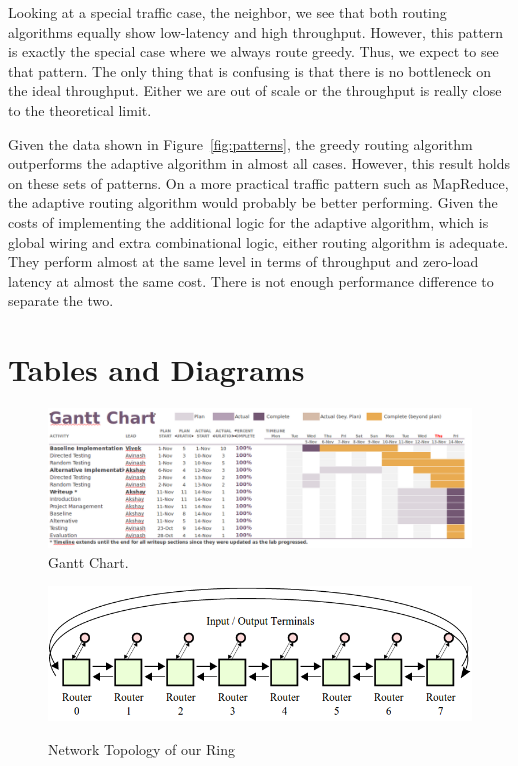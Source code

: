\documentclass[10pt]{article}
\begin{document}
Looking at a special traffic case, the neighbor, we see that both 
routing algorithms equally show low-latency and high throughput. 
However, this pattern is exactly the special case where we always 
route greedy. Thus, we expect to see that pattern.
The only thing that is confusing is that there is no bottleneck on the ideal
throughput.
Either we are out of scale or the throughput is really close to the theoretical
limit. \par

Given the data shown in Figure~\ref{fig:patterns}, the greedy routing algorithm 
outperforms the adaptive algorithm in almost all cases. 
However, this result holds on these sets of patterns.
On a more practical traffic pattern such as MapReduce, the adaptive routing 
algorithm would probably be better performing. 
Given the costs of implementing the additional logic for the adaptive 
algorithm, which is global wiring and extra combinational logic, either 
routing algorithm is adequate. 
They perform almost at the same level in terms of throughput and zero-load
latency at almost the same cost. 
There is not enough performance difference to separate the two. 


\newpage
\section {Tables and Diagrams}


\begin{figure}[h]
	\centering
	\includegraphics[scale=0.4, angle=90]{gantt}
	\caption{Gantt Chart.}
	\label{fig:gantt}
\end{figure}

\begin{figure}[h]
	\centering
	\includegraphics[scale=0.5]{topology}
	\label{fig:topo}
	\caption{Network Topology of our Ring}
\end{figure}
\end{document}
